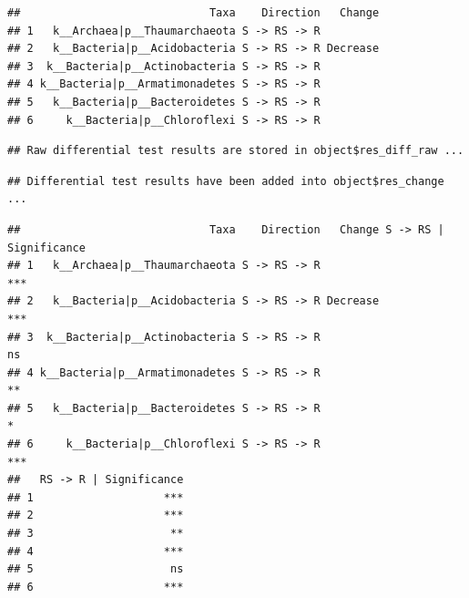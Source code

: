 \documentclass[
]{book}
\newenvironment{Shaded}{\begin{snugshade}}{\end{snugshade}}
\newcommand{\AttributeTok}[1]{\textcolor[rgb]{0.13,0.29,0.53}{#1}}
\newcommand{\CommentTok}[1]{\textcolor[rgb]{0.56,0.35,0.01}{\textit{#1}}}
\newcommand{\ConstantTok}[1]{\textcolor[rgb]{0.56,0.35,0.01}{#1}}
\newcommand{\FunctionTok}[1]{\textcolor[rgb]{0.13,0.29,0.53}{\textbf{#1}}}
\newcommand{\NormalTok}[1]{#1}
\newcommand{\SpecialCharTok}[1]{\textcolor[rgb]{0.81,0.36,0.00}{\textbf{#1}}}
\newcommand{\StringTok}[1]{\textcolor[rgb]{0.31,0.60,0.02}{#1}}
\begin{document}
\begin{verbatim}
##                             Taxa    Direction   Change
## 1   k__Archaea|p__Thaumarchaeota S -> RS -> R         
## 2   k__Bacteria|p__Acidobacteria S -> RS -> R Decrease
## 3  k__Bacteria|p__Actinobacteria S -> RS -> R         
## 4 k__Bacteria|p__Armatimonadetes S -> RS -> R         
## 5   k__Bacteria|p__Bacteroidetes S -> RS -> R         
## 6     k__Bacteria|p__Chloroflexi S -> RS -> R
\end{verbatim}

\begin{Shaded}
\end{Shaded}

\begin{verbatim}
## Raw differential test results are stored in object$res_diff_raw ...
\end{verbatim}

\begin{verbatim}
## Differential test results have been added into object$res_change ...
\end{verbatim}

\begin{Shaded}
\end{Shaded}

\begin{verbatim}
##                             Taxa    Direction   Change S -> RS | Significance
## 1   k__Archaea|p__Thaumarchaeota S -> RS -> R                             ***
## 2   k__Bacteria|p__Acidobacteria S -> RS -> R Decrease                    ***
## 3  k__Bacteria|p__Actinobacteria S -> RS -> R                              ns
## 4 k__Bacteria|p__Armatimonadetes S -> RS -> R                              **
## 5   k__Bacteria|p__Bacteroidetes S -> RS -> R                               *
## 6     k__Bacteria|p__Chloroflexi S -> RS -> R                             ***
##   RS -> R | Significance
## 1                    ***
## 2                    ***
## 3                     **
## 4                    ***
## 5                     ns
## 6                    ***
\end{verbatim}
\end{document}
